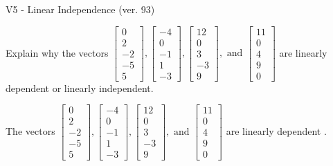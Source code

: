 \begin{exercise}
  \begin{exerciseTitle}V5 - Linear Independence (ver. 93)\end{exerciseTitle}
  \begin{exerciseStatement}
    Explain why the vectors \(\left[\begin{array}{r}
0 \\
2 \\
-2 \\
-5 \\
5
\end{array}\right] , \left[\begin{array}{r}
-4 \\
0 \\
-1 \\
1 \\
-3
\end{array}\right] , \left[\begin{array}{r}
12 \\
0 \\
3 \\
-3 \\
9
\end{array}\right] , \text{ and } \left[\begin{array}{r}
11 \\
0 \\
4 \\
9 \\
0
\end{array}\right]\) are linearly dependent or linearly independent.	


  \end{exerciseStatement}
  \begin{exerciseAnswer}
   The vectors \(\left[\begin{array}{r}
0 \\
2 \\
-2 \\
-5 \\
5
\end{array}\right] , \left[\begin{array}{r}
-4 \\
0 \\
-1 \\
1 \\
-3
\end{array}\right] , \left[\begin{array}{r}
12 \\
0 \\
3 \\
-3 \\
9
\end{array}\right] , \text{ and } \left[\begin{array}{r}
11 \\
0 \\
4 \\
9 \\
0
\end{array}\right]\) are 
  	 linearly dependent  .
  


  \end{exerciseAnswer}
\end{exercise}